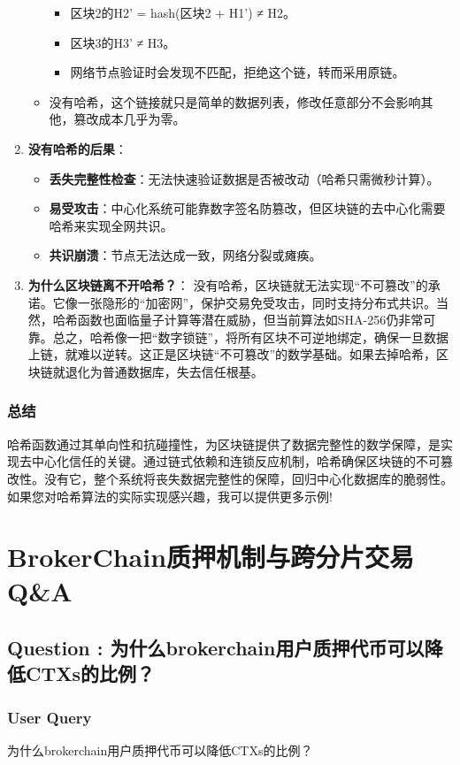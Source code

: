 \documentclass[a4paper,12pt]{ctexart}
\begin{document}
\begin{enumerate}
\begin{itemize}
\begin{itemize}
\item 区块2的H2' = hash(区块2 + H1') ≠ H2。
\item 区块3的H3' ≠ H3。
\item 网络节点验证时会发现不匹配，拒绝这个链，转而采用原链。
\end{itemize}
\item 没有哈希，这个链接就只是简单的数据列表，修改任意部分不会影响其他，篡改成本几乎为零。
\end{itemize}
\item \textbf{没有哈希的后果}：
\begin{itemize}
\item \textbf{丢失完整性检查}：无法快速验证数据是否被改动（哈希只需微秒计算）。
\item \textbf{易受攻击}：中心化系统可能靠数字签名防篡改，但区块链的去中心化需要哈希来实现全网共识。
\item \textbf{共识崩溃}：节点无法达成一致，网络分裂或瘫痪。
\end{itemize}
\item \textbf{为什么区块链离不开哈希？}：
没有哈希，区块链就无法实现“不可篡改”的承诺。它像一张隐形的“加密网”，保护交易免受攻击，同时支持分布式共识。当然，哈希函数也面临量子计算等潜在威胁，但当前算法如SHA-256仍非常可靠。总之，哈希像一把“数字锁链”，将所有区块不可逆地绑定，确保一旦数据上链，就难以逆转。这正是区块链“不可篡改”的数学基础。如果去掉哈希，区块链就退化为普通数据库，失去信任根基。
\end{enumerate}
\subsubsection*{总结}
哈希函数通过其单向性和抗碰撞性，为区块链提供了数据完整性的数学保障，是实现去中心化信任的关键。通过链式依赖和连锁反应机制，哈希确保区块链的不可篡改性。没有它，整个系统将丧失数据完整性的保障，回归中心化数据库的脆弱性。如果您对哈希算法的实际实现感兴趣，我可以提供更多示例!

\section*{BrokerChain质押机制与跨分片交易Q\&A}

\subsection*{Question : 为什么brokerchain用户质押代币可以降低CTXs的比例？}
\subsubsection*{User Query}
为什么brokerchain用户质押代币可以降低CTXs的比例？
\end{document}

